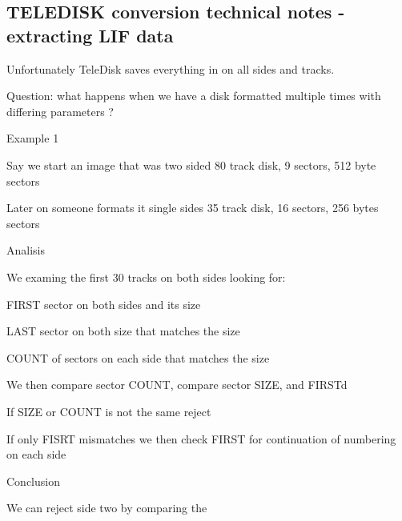 \subsection*{T\+E\+L\+E\+D\+I\+SK conversion technical notes -\/ extracting L\+IF data}


\begin{DoxyItemize}
\item Unfortunately Tele\+Disk saves everything in on all sides and tracks.
\begin{DoxyItemize}
\item Question\+: what happens when we have a disk formatted multiple times with differing parameters ?
\end{DoxyItemize}
\item Example 1
\begin{DoxyItemize}
\item Say we start an image that was two sided 80 track disk, 9 sectors, 512 byte sectors
\item Later on someone formats it single sides 35 track disk, 16 sectors, 256 bytes sectors
\end{DoxyItemize}
\item Analisis
\begin{DoxyItemize}
\item We examing the first 30 tracks on both sides looking for\+:
\begin{DoxyItemize}
\item F\+I\+R\+ST sector on both sides and its size
\item L\+A\+ST sector on both size that matches the size
\item C\+O\+U\+NT of sectors on each side that matches the size
\end{DoxyItemize}
\item We then compare sector C\+O\+U\+NT, compare sector S\+I\+ZE, and F\+I\+R\+S\+Td
\begin{DoxyItemize}
\item If S\+I\+ZE or C\+O\+U\+NT is not the same reject
\item If only F\+I\+S\+RT mismatches we then check F\+I\+R\+ST for continuation of numbering on each side
\end{DoxyItemize}
\end{DoxyItemize}
\item Conclusion
\begin{DoxyItemize}
\item We can reject side two by comparing the
\begin{DoxyItemize}

\end{DoxyItemize}
\end{DoxyItemize}
\end{DoxyItemize}
